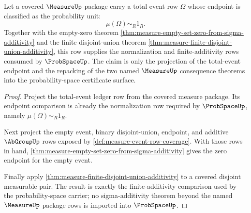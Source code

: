 \begin{theorem}
\label{thm:measure-probability-normalization-row}
Let a covered $\MeasureUp$ package carry a total event row $\Omega$ whose
endpoint is classified as the probability unit:
$$
\mu(\Omega)\sim_R 1_R.
$$
Together with the empty-zero theorem
\autoref{thm:measure-empty-set-zero-from-sigma-additivity} and the finite
disjoint-union theorem
\autoref{thm:measure-finite-disjoint-union-additivity}, this row supplies the
normalization and finite-additivity rows consumed by $\ProbSpaceUp$. The claim
is only the projection of the total-event endpoint and the repacking of the
two named $\MeasureUp$ consequence theorems into the probability-space
certificate surface.
\end{theorem}
\begin{proof}
Project the total-event ledger row from the covered measure package. Its
endpoint comparison is already the normalization row required by
$\ProbSpaceUp$, namely $\mu(\Omega)\sim_R1_R$.

Next project the empty event, binary disjoint-union, endpoint, and additive
$\AbGroupUp$ rows exposed by \autoref{def:measure-event-row-coverage}. With
those rows in hand, \autoref{thm:measure-empty-set-zero-from-sigma-additivity}
gives the zero endpoint for the empty event.

Finally apply \autoref{thm:measure-finite-disjoint-union-additivity} to a
covered disjoint measurable pair. The result is exactly the finite-additivity
comparison used by the probability-space carrier; no sigma-additivity theorem
beyond the named $\MeasureUp$ package rows is imported into $\ProbSpaceUp$.
\end{proof}

